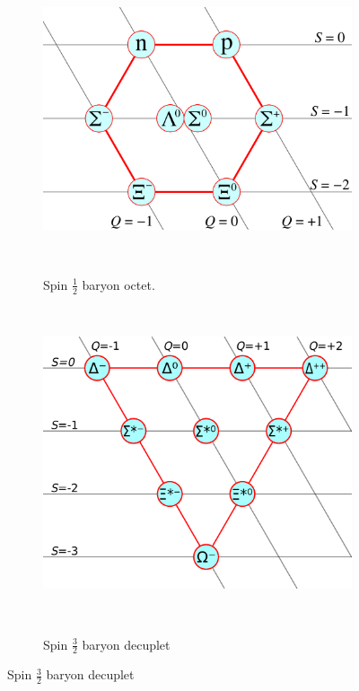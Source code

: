 \documentclass[11pt, oneside]{article}   	%
\theoremstyle{definition}
\numberwithin{equation}{subsection}		%
\begin{document}
\begin{figure}[H]
	\centering
	\begin{subfigure}[t]{.38\textwidth}
		\centering
		\includegraphics[width = .8\textwidth]{baryon_octet}
		\caption{Spin $\frac{1}{2}$ baryon octet.}~
		\label{subfig:baryon_octet}
	\end{subfigure}
	~
	\begin{subfigure}[t]{.38\textwidth}
		\centering
		\includegraphics[width = .8\textwidth]{baryon_decuplet}
		\caption{Spin $\frac{3}{2}$ baryon decuplet}~
		\label{subfig:baryon_decuplet}
	\end{subfigure}
\end{figure}
\end{document}
